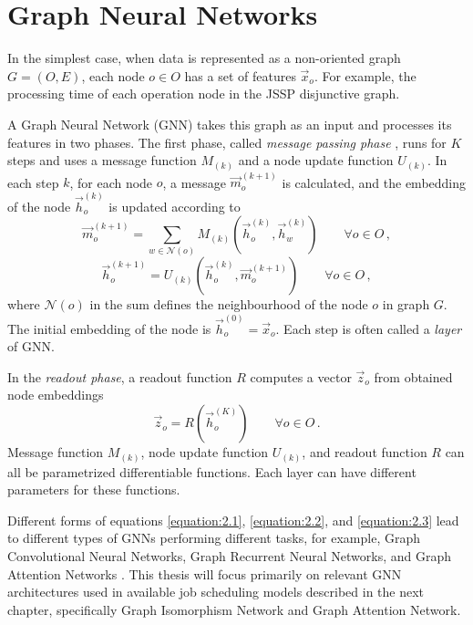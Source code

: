 \section{Graph Neural Networks}

In the simplest case, when data is represented as a non-oriented graph $G = (O, E)$, each node $o \in O$ has a set of features $\vec{x}_o$. For example, the processing time of each operation node in the JSSP disjunctive graph. 
\par
A Graph Neural Network (GNN) takes this graph as an input and processes its features in two phases. The first phase, called \textit{message passing phase} \cite{pmlr-v70-gilmer17a}, runs for $K$ steps and uses a message function $M_{(k)}$ and a node update function $U_{(k)}$. In each step $k$, for each node $o$, a message $\vec{m}_o^{(k + 1)}$ is calculated, and the embedding of the node $\vec{h}_o^{(k)}$ is updated according to \cite{pmlr-v70-gilmer17a}
\begin{equation}\label{equation:2.1}
	\vec{m}_o^{(k + 1)} = \sum_{w \in \mathcal{N}(o)} M_{(k)} \left(\vec{h}_o^{(k)}, \vec{h}_w^{(k)}\right) \hspace{2em} \forall o \in O \, ,
\end{equation}
\begin{equation}\label{equation:2.2}
	\vec{h}_o^{(k+1)} = U_{(k)} \left(\vec{h}_o^{(k)}, \vec{m}_o^{(k+1)}\right) \hspace{2em }\forall o \in O \, , 
\end{equation}
where $\mathcal{N}(o)$ in the sum defines the neighbourhood of the node $o$ in graph $G$. The initial embedding of the node is $\vec{h}_o^{(0)} = \vec{x}_o$. Each step is often called a \textit{layer} of GNN.
\par
In the \textit{readout phase}, a readout function $R$ computes a vector $\vec{z}_o$ from obtained node embeddings \cite{pmlr-v70-gilmer17a}
\begin{equation}\label{equation:2.3}
	\vec{z}_o = R\left(\vec{h}_o^{(K)}\right) \hspace{2em} \forall o \in O \, .
\end{equation}
Message function $M_{(k)}$, node update function $U_{(k)}$, and readout function $R$ can all be parametrized differentiable functions. Each layer can have different parameters for these functions.
\par
Different forms of equations \ref{equation:2.1}, \ref{equation:2.2}, and \ref{equation:2.3} lead to different types of GNNs performing different tasks, for example, Graph Convolutional Neural Networks, Graph Recurrent Neural Networks, and Graph Attention Networks \cite{sanchez-lengeling2021a, 10.1145/3495161, DBLP:journals/corr/abs-1810-00826}. This thesis will focus primarily on relevant GNN architectures used in available job scheduling models described in the next chapter, specifically Graph Isomorphism Network and Graph Attention Network.

